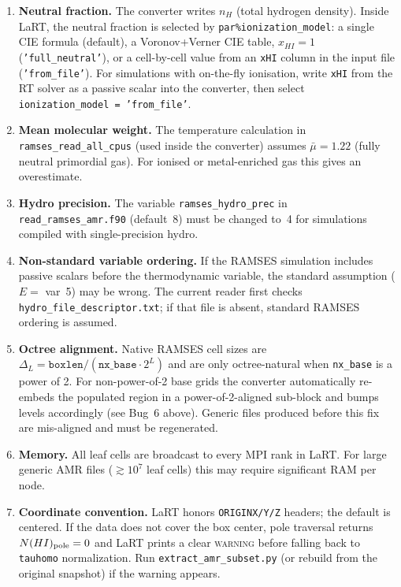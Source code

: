 \documentclass[english,a4paper]{my_memo}
\begin{document}
\begin{enumerate}
  \item \textbf{Neutral fraction.}  The converter writes $n_H$ (total
        hydrogen density).  Inside LaRT, the neutral fraction is selected
        by \texttt{par\%ionization\_model}: a single CIE formula (default),
        a Voronov+Verner CIE table, $x_{HI}=1$ (\texttt{'full\_neutral'}),
        or a cell-by-cell value from an \texttt{xHI} column in the input file
        (\texttt{'from\_file'}).  For simulations with on-the-fly
        ionisation, write \texttt{xHI} from the RT solver as a passive
        scalar into the converter, then select \texttt{ionization\_model =
        'from\_file'}.

  \item \textbf{Mean molecular weight.}  The temperature calculation in
        \texttt{ramses\_read\_all\_cpus} (used inside the converter)
        assumes $\bar\mu = 1.22$ (fully neutral primordial gas).  For
        ionised or metal-enriched gas this gives an overestimate.

  \item \textbf{Hydro precision.}  The variable \texttt{ramses\_hydro\_prec}
        in \texttt{read\_ramses\_amr.f90} (default~8) must be changed to~4
        for simulations compiled with single-precision hydro.

  \item \begin{sloppypar}\textbf{Non-standard variable ordering.}  If the RAMSES
        simulation includes passive scalars before the thermodynamic
        variable, the standard assumption ($E =$ var~5) may be wrong.
        The current reader first checks
        \texttt{hydro\_file\_descriptor.txt}; if that file is absent,
        standard RAMSES ordering is assumed.\end{sloppypar}

  \item \textbf{Octree alignment.}  Native RAMSES cell sizes are
        $\Delta_L = \texttt{boxlen}/(\texttt{nx\_base}\cdot 2^L)$ and are
        only octree-natural when \texttt{nx\_base} is a power of 2.  For
        non-power-of-2 base grids the converter automatically re-embeds
        the populated region in a power-of-2-aligned sub-block and bumps
        levels accordingly (see Bug~6 above).  Generic files produced
        before this fix are mis-aligned and must be regenerated.

  \item \textbf{Memory.}  All leaf cells are broadcast to every MPI rank
        in LaRT.  For large generic AMR files ($\gtrsim 10^7$ leaf cells)
        this may require significant RAM per node.

  \item \textbf{Coordinate convention.}  LaRT honors \texttt{ORIGINX/Y/Z}
        headers; the default is centered.  If the data does not cover
        the box center, pole traversal returns $N(HI)_{\rm pole}=0$ and
        LaRT prints a clear \textsc{warning} before falling back to
        \texttt{tauhomo} normalization.  Run \texttt{extract\_amr\_subset.py}
        (or rebuild from the original snapshot) if the warning appears.
\end{enumerate}
\end{document}
